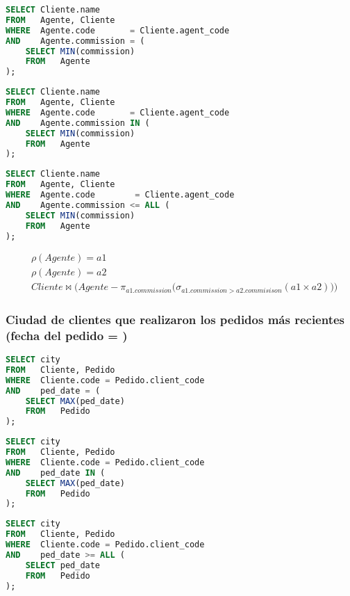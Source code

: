 \begin{lstlisting}[language=SQL]
SELECT Cliente.name
FROM   Agente, Cliente
WHERE  Agente.code       = Cliente.agent_code
AND    Agente.commission = (
	SELECT MIN(commission)
	FROM   Agente
);
\end{lstlisting}

\begin{lstlisting}[language=SQL]
SELECT Cliente.name
FROM   Agente, Cliente
WHERE  Agente.code       = Cliente.agent_code
AND    Agente.commission IN (
	SELECT MIN(commission)
	FROM   Agente
);
\end{lstlisting}

\begin{lstlisting}[language=SQL]
SELECT Cliente.name
FROM   Agente, Cliente
WHERE  Agente.code        = Cliente.agent_code
AND    Agente.commission <= ALL (
	SELECT MIN(commission)
	FROM   Agente
);
\end{lstlisting}

\[
\begin{split}
	& \rho(Agente)=a1 \\
	& \rho(Agente)=a2 \\
	& Cliente\bowtie \Big(Agente-\pi_{a1.commission}\big(\sigma_{a1.commission>a2.commisison}(a1\times a2)\big)\Big)
\end{split}
\]

\subsubsection{Ciudad de clientes que realizaron los pedidos más recientes (fecha del pedido = )}

\begin{lstlisting}[language=SQL]
SELECT city
FROM   Cliente, Pedido
WHERE  Cliente.code = Pedido.client_code
AND    ped_date = (
	SELECT MAX(ped_date)
	FROM   Pedido
);
\end{lstlisting}

\begin{lstlisting}[language=SQL]
SELECT city
FROM   Cliente, Pedido
WHERE  Cliente.code = Pedido.client_code
AND    ped_date IN (
	SELECT MAX(ped_date)
	FROM   Pedido
);
\end{lstlisting}

\begin{lstlisting}[language=SQL]
SELECT city
FROM   Cliente, Pedido
WHERE  Cliente.code = Pedido.client_code
AND    ped_date >= ALL (
	SELECT ped_date
	FROM   Pedido
);
\end{lstlisting}

